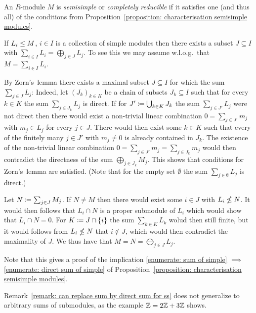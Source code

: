 \begin{definition}
  An $R$-module $M$ is \emph{semisimple} or \emph{completely reducible} if it satisfies one (and thus all) of the conditions from Proposition~\ref{proposition: characterisation semisimple modules}.
\end{definition}


\begin{remark}
  \label{remark: can replace sum by direct sum for ss}
  If $L_i \leq M$, $i \in I$ is a collection of simple modules then there exists a subset $J \subseteq I$ with $\sum_{i \in I} L_i = \bigoplus_{j \in J} L_j$.
  To see this we may assume w.l.o.g.\ that $M = \sum_{i \in I} L_i$.
  
  By Zorn’s~lemma there exists a maximal subset $J \subseteq I$ for which the sum $\sum_{j \in J} L_j$:
  Indeed, let $(J_k)_{k \in K}$ be a chain of subsets $J_k \subseteq I$ such that for every $k \in K$ the sum $\sum_{j \in J_k} L_j$ is direct.
  If for $J' \coloneqq \bigcup_{k \in K} J_k$ the sum $\sum_{j \in J'} L_j$ were not direct then there would exist a non-trivial linear combination $0 = \sum_{j \in J'} m_j$ with $m_j \in L_j$ for every $j \in J$.
  There would then exist some $k \in K$ such that every of the finitely many $j \in J'$ with $m_j \neq 0$ is already contained in $J_k$.
  The existence of the non-trivial linear combination $0 = \sum_{j \in J'} m_j = \sum_{j \in J_k} m_j$ would then contradict the directness of the sum $\bigoplus_{j \in J_k} M_j$.
  This shows that conditions for Zorn’s~lemma are satisfied.
  (Note that for the empty set $\emptyset$ the sum $\sum_{j \in \emptyset} L_j$ is direct.)
  
  Let $N \coloneqq \sum_{j \in J} M_j$.
  If $N \neq M$ then there would exist some $i \in J$ with $L_i \nleq N$.
  It would then follows that $L_i \cap N$ is a proper submodule of $L_i$ which would show that $L_i \cap N = 0$.
  For $K \coloneqq J \cap \{i\}$ the sum $\sum_{k \in K} L_k$ wolud then still finite, but it would follows from $L_i \nleq N$ that $i \notin J$, which would then contradict the maximality of $J$.
  We thus have that $M = N = \bigoplus_{j \in J} L_j$.
  
  Note that this gives a proof of the implication \ref*{enumerate: sum of simple} $\implies$ \ref*{enumerate: direct sum of simple} of Proposition~\ref{proposition: characterisation semisimple modules}.
\end{remark}


\begin{warning}
  Remark~\ref{remark: can replace sum by direct sum for ss} does not generalize to arbitrary sums of submodules, as the example $\mathbb{Z} = 2\mathbb{Z} + 3\mathbb{Z}$ shows.
\end{warning}


